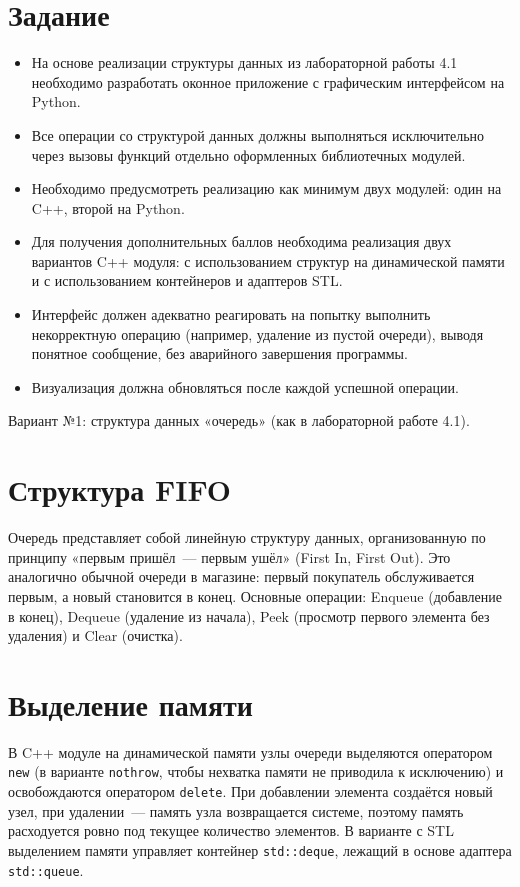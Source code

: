 \documentclass[oneside,a4paper,14pt]{extarticle} %
\begin{document}
\section{Задание}
\begin{itemize}
\item На основе реализации структуры данных из лабораторной работы 4.1 необходимо разработать оконное приложение с графическим интерфейсом на Python.
\item Все операции со структурой данных должны выполняться исключительно через вызовы функций отдельно оформленных библиотечных модулей.
\item Необходимо предусмотреть реализацию как минимум двух модулей: один на C++, второй на Python.
\item Для получения дополнительных баллов необходима реализация двух вариантов C++ модуля: с использованием структур на динамической памяти и с использованием контейнеров и адаптеров STL.
\item Интерфейс должен адекватно реагировать на попытку выполнить некорректную операцию (например, удаление из пустой очереди), выводя понятное сообщение, без аварийного завершения программы.
\item Визуализация должна обновляться после каждой успешной операции.
\end{itemize}
Вариант №1: структура данных «очередь» (как в лабораторной работе 4.1).

\clearpage
\section{Структура FIFO}
Очередь представляет собой линейную структуру данных, организованную по принципу «первым пришёл~--- первым ушёл» (First In, First Out). Это аналогично обычной очереди в магазине: первый покупатель обслуживается первым, а новый становится в конец. Основные операции: Enqueue (добавление в конец), Dequeue (удаление из начала), Peek (просмотр первого элемента без удаления) и Clear (очистка).

\section{Выделение памяти}
В C++ модуле на динамической памяти узлы очереди выделяются оператором \texttt{new} (в варианте \texttt{nothrow}, чтобы нехватка памяти не приводила к исключению) и освобождаются оператором \texttt{delete}. При добавлении элемента создаётся новый узел, при удалении~--- память узла возвращается системе, поэтому память расходуется ровно под текущее количество элементов. В варианте с STL выделением памяти управляет контейнер \texttt{std::deque}, лежащий в основе адаптера \texttt{std::queue}.
\end{document}
